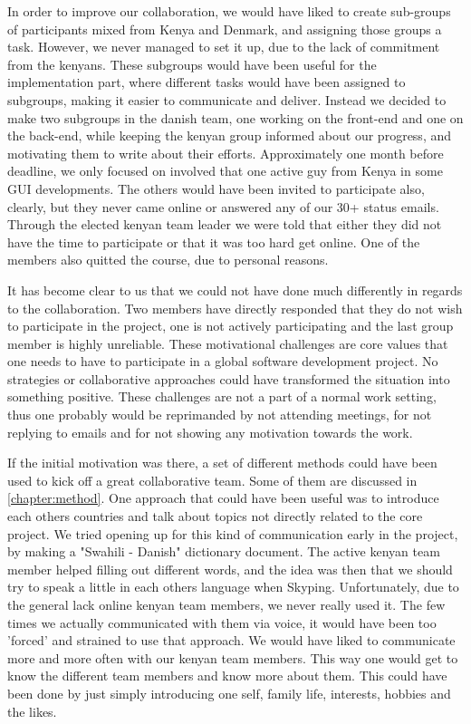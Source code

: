 In order to improve our collaboration, we would have liked to create sub-groups of participants mixed from Kenya and Denmark, and assigning those groups a task. However, we never managed to set it up, due to the lack of commitment from the kenyans. These subgroups would have been useful for the implementation part, where different tasks would have been assigned to subgroups, making it easier to communicate and deliver. Instead we decided to make two subgroups in the danish team, one working on the front-end and one on the back-end, while keeping the kenyan group informed about our progress, and motivating them to write about their efforts. Approximately one month before deadline, we only focused on involved that one active guy from Kenya in some GUI developments. The others would have been invited to participate also, clearly, but they never came online or answered any of our 30+ status emails. Through the elected kenyan team leader we were told that either they did not have the time to participate or that it was too hard get online. One of the members also quitted the course, due to personal reasons. 

It has become clear to us that we could not have done much differently in regards to the collaboration. Two members have directly responded that they do not wish to participate in the project, one is not actively participating and the last group member is highly unreliable. These motivational challenges are core values that one needs to have to participate in a global software development project. No strategies or collaborative approaches could have transformed the situation into something positive. These challenges are not a part of a normal work setting, thus one probably would be reprimanded by not attending meetings, for not replying to emails and for not showing any motivation towards the work.

If the initial motivation was there, a set of different methods could have been used to kick off a great collaborative team. Some of them are discussed in \ref{chapter:method}. One approach that could have been useful was to introduce each others countries and talk about topics not directly related to the core project. We tried opening up for this kind of communication early in the project, by making a "Swahili - Danish" dictionary document. The active kenyan team member helped filling out different words, and the idea was then that we should try to speak a little in each others language when Skyping. Unfortunately, due to the general lack online kenyan team members, we never really used it. The few times we actually communicated with them via voice, it would have been too 'forced' and strained to use that approach. We would have liked to communicate more and more often with our kenyan team members. This way one would get to know the different team members and know more about them. This could have been done by just simply introducing one self, family life, interests, hobbies and the likes.

